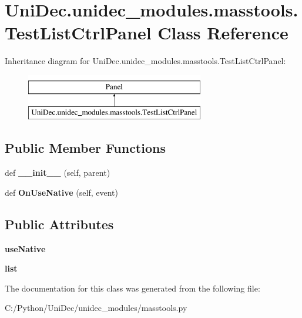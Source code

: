 \hypertarget{class_uni_dec_1_1unidec__modules_1_1masstools_1_1_test_list_ctrl_panel}{}\section{Uni\+Dec.\+unidec\+\_\+modules.\+masstools.\+Test\+List\+Ctrl\+Panel Class Reference}
\label{class_uni_dec_1_1unidec__modules_1_1masstools_1_1_test_list_ctrl_panel}
Inheritance diagram for Uni\+Dec.\+unidec\+\_\+modules.\+masstools.\+Test\+List\+Ctrl\+Panel\+:\begin{figure}[H]
\begin{center}
\leavevmode
\includegraphics[height=2.000000cm]{class_uni_dec_1_1unidec__modules_1_1masstools_1_1_test_list_ctrl_panel}
\end{center}
\end{figure}
\subsection*{Public Member Functions}
\begin{DoxyCompactItemize}
\item 
\hypertarget{class_uni_dec_1_1unidec__modules_1_1masstools_1_1_test_list_ctrl_panel_ab69a33c9f2f54a09355d4687d8e1dfd8}{}def {\bfseries \+\_\+\+\_\+init\+\_\+\+\_\+} (self, parent)\label{class_uni_dec_1_1unidec__modules_1_1masstools_1_1_test_list_ctrl_panel_ab69a33c9f2f54a09355d4687d8e1dfd8}

\item 
\hypertarget{class_uni_dec_1_1unidec__modules_1_1masstools_1_1_test_list_ctrl_panel_a6063097343e59e33c9db5b7ef8fa4456}{}def {\bfseries On\+Use\+Native} (self, event)\label{class_uni_dec_1_1unidec__modules_1_1masstools_1_1_test_list_ctrl_panel_a6063097343e59e33c9db5b7ef8fa4456}

\end{DoxyCompactItemize}
\subsection*{Public Attributes}
\begin{DoxyCompactItemize}
\item 
\hypertarget{class_uni_dec_1_1unidec__modules_1_1masstools_1_1_test_list_ctrl_panel_a39599eb8a6fad8ae14bdad46826bcf44}{}{\bfseries use\+Native}\label{class_uni_dec_1_1unidec__modules_1_1masstools_1_1_test_list_ctrl_panel_a39599eb8a6fad8ae14bdad46826bcf44}

\item 
\hypertarget{class_uni_dec_1_1unidec__modules_1_1masstools_1_1_test_list_ctrl_panel_ae5d4c841c878e6757c89a2b5c23703fb}{}{\bfseries list}\label{class_uni_dec_1_1unidec__modules_1_1masstools_1_1_test_list_ctrl_panel_ae5d4c841c878e6757c89a2b5c23703fb}

\end{DoxyCompactItemize}


The documentation for this class was generated from the following file\+:\begin{DoxyCompactItemize}
\item 
C\+:/\+Python/\+Uni\+Dec/unidec\+\_\+modules/masstools.\+py\end{DoxyCompactItemize}
